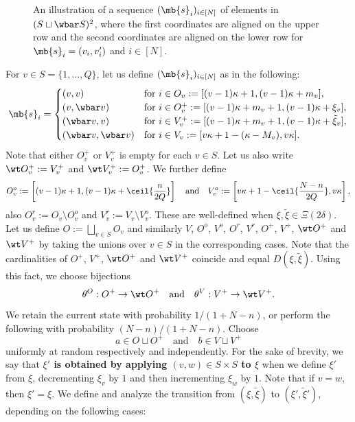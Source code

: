\documentclass[12pt, reqno]{amsart}
\begin{document}
\begin{figure}
\caption{An illustration of a sequence $(\mb{s}_i)_{i \in [N]}$ of elements in $(S\sqcup \wbar S)^2$,
where the first coordinates are aligned on the upper row and the second coordinates are aligned on the lower row for $\mb{s}_i=(v_i, v'_i)$ and $i \in [N]$.}
\label{Fig:coupling_load}
\end{figure}
For $v \in S=\{1, \dots, Q\}$,
let us define $(\mb{s}_i)_{i \in [N]}$ as in the following:
\[
\mb{s}_i=
\begin{cases}
(v, v) & \text{for $i \in O_v:=[(v-1)\kappa+1, (v-1)\kappa+m_v]$},\\
(v, \wbar v) & \text{for $i \in O_v^+:=[(v-1)\kappa+m_v+1, (v-1)\kappa+\xi_v]$},\\
(\wbar v, v) & \text{for $i \in V_v^+:=[(v-1)\kappa+m_v+1, (v-1)\kappa+\tilde \xi_v]$},\\
(\wbar v, \wbar v) & \text{for $i \in V_v:=[v \kappa+1-(\kappa-M_v), v \kappa]$}.
\end{cases}
\]
Note that either $O_v^+$ or $V_v^+$ is empty for each $v \in S$.
Let us also write $\wt O_v^+:=V_v^+$
and $\wt V_v^+:=O_v^+$.
We further define
\[
O_v^o:=\left[(v-1)\kappa+1, (v-1)\kappa +\ceil{\frac{n}{2Q}}\right]
\quad \text{and} \quad
V_v^o:=\left[v\kappa+1-\ceil{\frac{N-n}{2Q}}, v \kappa\right],
\]
also $O_v^r:=O_v\setminus O_v^o$ and $V_v^r:=V_v\setminus V_v^o$.
These are well-defined when $\xi, \tilde \xi \in \Xi(2\delta)$.
Let us define $O:=\bigsqcup_{v \in S}O_v$ and similarly $V$, $O^o$, $V^o$, $O^r$, $V^r$, $O^+$, $V^+$, $\wt O^+$ and $\wt V^+$ by taking the unions over $v \in S$ in the corresponding cases.
Note that the cardinalities of $O^+$, $V^+$, $\wt O^+$ and $\wt V^+$ coincide and equal $D(\xi, \tilde \xi)$.
Using this fact,
we choose bijections
\[
\theta^O: O^+\to \wt O^+ \quad \text{and} \quad \theta^V:V^+ \to \wt V^+.
\]

We retain the current state with probability $1/(1+N-n)$,
or perform the following with probability $(N-n)/(1+N-n)$.
Choose 
\[
a \in O\sqcup O^+ \quad \text{and} \quad b \in V\sqcup V^+
\]
uniformly at random respectively and independently.
For the sake of brevity,
we say that {\bf $\xi'$ is obtained by applying $(v, w) \in S \times S$ to $\xi$} 
when we define $\xi'$ from $\xi$,
decrementing $\xi_v$ by $1$ and then incrementing $\xi_w$ by $1$.
Note that if $v=w$,
then $\xi'=\xi$.
We define and analyze the transition from $(\xi, \tilde \xi)$ to $(\xi', \tilde \xi')$, depending on the following cases:
\end{document}
